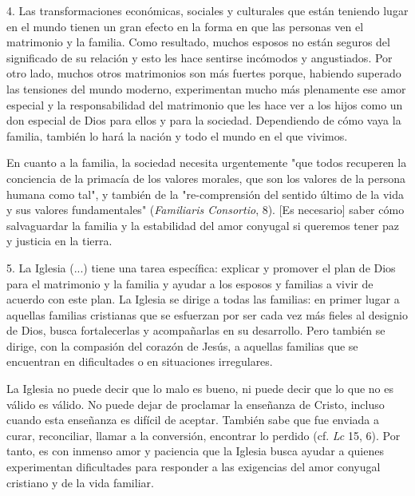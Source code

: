 \begin{body}
\begin{body}
4. Las transformaciones económicas, sociales y culturales que están teniendo lugar en el mundo tienen un gran efecto en la forma en que las personas ven el matrimonio y la familia. Como resultado, muchos esposos no están seguros del significado de su relación y esto les hace sentirse incómodos y angustiados. Por otro lado, muchos otros matrimonios son más fuertes porque, habiendo superado las tensiones del mundo moderno, experimentan mucho más plenamente ese amor especial y la responsabilidad del matrimonio que les hace ver a los hijos como un don especial de Dios para ellos y para la sociedad. Dependiendo de cómo vaya la familia, también lo hará la nación y todo el mundo en el que vivimos.

En cuanto a la familia, la sociedad necesita urgentemente "que todos recuperen la conciencia de la primacía de los valores morales, que son los valores de la persona humana como tal", y también de la "re-comprensión del sentido último de la vida y sus valores fundamentales" (\emph{Familiaris Consortio}, 8). {[}Es necesario{]} saber cómo salvaguardar la familia y la estabilidad del amor conyugal si queremos tener paz y justicia en la tierra.

5. La Iglesia (...) tiene una tarea específica: explicar y promover el plan de Dios para el matrimonio y la familia y ayudar a los esposos y familias a vivir de acuerdo con este plan. La Iglesia se dirige a todas las familias: en primer lugar a aquellas familias cristianas que se esfuerzan por ser cada vez más fieles al designio de Dios, busca fortalecerlas y acompañarlas en su desarrollo. Pero también se dirige, con la compasión del corazón de Jesús, a aquellas familias que se encuentran en dificultades o en situaciones irregulares.

La Iglesia no puede decir que lo malo es bueno, ni puede decir que lo que no es válido es válido. No puede dejar de proclamar la enseñanza de Cristo, incluso cuando esta enseñanza es difícil de aceptar. También sabe que fue enviada a curar, reconciliar, llamar a la conversión, encontrar lo perdido (cf. \emph{Lc} 15, 6). Por tanto, es con inmenso amor y paciencia que la Iglesia busca ayudar a quienes experimentan dificultades para responder a las exigencias del amor conyugal cristiano y de la vida familiar.


\end{body}
\end{body}

